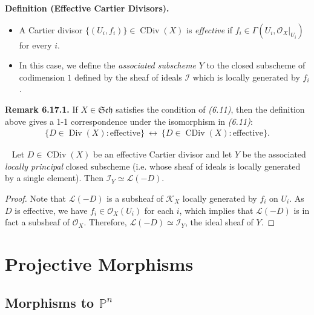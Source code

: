 \documentclass[11pt,a4paper,footinclude=true,headinclude=true]{scrbook} %
\DeclareMathOperator{\CDiv}{CDiv}
\DeclareMathOperator{\Div}{Div}
\newcommand{\II}{\mathscr{I}}
\newcommand{\KK}{\mathscr{K}}
\newcommand{\LL}{\mathscr{L}}
\newcommand{\OO}{\mathcal{O}}
\newcommand{\PP}{\mathbb{P}}
\newcommand{\Sch}{\mathfrak{Sch}}
\newcommand{\<}{\langle}
\newcommand{\>}{\rangle}
\newenvironment{proposition}[2][]
{\renewcommand\theinnercustomprop{#2}\innercustomprop[#1] 
\begin{mdframed}[backgroundcolor=gray!20]\ }
{\end{mdframed}\endinnercustomprop}
\newenvironment{definition}[2][Definition]
    { \begin{mdframed}[backgroundcolor=gray!20] \textbf{#1 #2.}\ }
    {  \end{mdframed}}
\newenvironment{remark}[2][Remark]
    { \begin{mdframed}[backgroundcolor=gray!20] \textbf{#1 #2.} }
    {  \end{mdframed}}
\begin{document}
\begin{definition}{(Effective Cartier Divisors)}
    \begin{itemize}
        \item A Cartier divisor $\{(U_i,f_i)\}\in\CDiv(X)$ is \textit{effective} if $f_i\in\Gamma(U_i,\OO_X|_{U_i})$ for every $i$.
        \item In this case, we define the \textit{associated subscheme} $Y$ to the closed subscheme of codimension $1$ defined by the sheaf of ideals $\II$ which is locally generated by $f_i$.
    \end{itemize}
\end{definition}

\begin{remark}{6.17.1}
    If $X\in\Sch$ satisfies the condition of \textit{(6.11)}, then the definition above gives a 1-1 correspondence under the isomorphism in \textit{(6.11)}:
    \begin{align*}
        \{D\in\Div(X):\text{effective}\}\ \longleftrightarrow\ \{D\in\CDiv(X):\text{effective}\}.
    \end{align*}
\end{remark}

\begin{proposition}{6.18}
    Let $D\in\CDiv(X)$ be an effective Cartier divisor and let $Y$ be the associated \textit{locally principal} closed subscheme (i.e. whose sheaf of ideals is locally generated by a single element). Then $\II_Y\simeq\LL(-D)$.
\end{proposition}
\begin{proof}
    Note that $\LL(-D)$ is a subsheaf of $\KK_X$ locally generated by $f_i$ on $U_i$. As $D$ is effective, we have $f_i\in\OO_X(U_i)$ for each $i$, which implies that $\LL(-D)$ is in fact a subsheaf of $\OO_X$. Therefore, $\LL(-D)\simeq\II_Y$, the ideal sheaf of $Y$.
\end{proof}

\chapter{Projective Morphisms}
\section{Morphisms to $\PP^n$}
\end{document}
